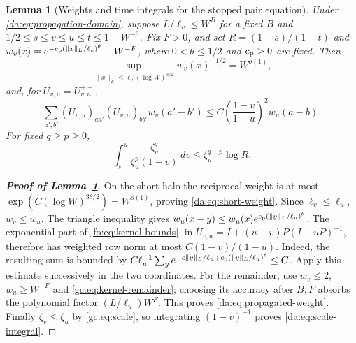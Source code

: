 \documentclass[11pt]{article}
\numberwithin{equation}{section}
\newtheorem{lemma}[theorem]{Lemma}
\theoremstyle{remark}
\begin{document}
\begin{lemma}[Weights and time integrals for the stopped pair equation]
\label{da:lem:stopped-pair-weights}
Under \eqref{da:eq:propagation-domain}, suppose
$L/\ell_v\le W^{B}$ for a fixed $B$ and $1/2\le s\le v\le u\le t\le1-W^{-3}$.
Fix $F>0$, and set $R=(1-s)/(1-t)$ and
$w_v(x)=e^{-c_{\rm p}(\|x\|_L/\ell_v)^\theta}+W^{-F}$,
where $0<\theta\le1/2$ and $c_{\rm p}>0$ are fixed.
Then
\begin{equation}\label{da:eq:short-weight}
 \sup_{\|x\|_L\le\ell_v(\log W)^{3/2}}w_v(x)^{-1/2}=W^{o(1)},
\end{equation}
and, for $U_{v,u}=U_{v,u}^{+-}$,
\begin{equation}\label{da:eq:propagated-weight}
 \sum_{a',b'}(U_{v,u})_{aa'}(U_{v,u})_{bb'}w_v(a'-b')
 \le C\left(\frac{1-v}{1-u}\right)^2 w_u(a-b).
\end{equation}
For fixed $q\ge p\ge0$,
\begin{equation}\label{da:eq:scale-integral}
 \int_s^u\frac{\zeta_v^q}{\zeta_u^p(1-v)}\,dv
 \le\zeta_u^{q-p}\log R.
\end{equation}
\end{lemma}
\begin{proof}[\textbf{Proof of Lemma~\ref{da:lem:stopped-pair-weights}}]
On the short halo the reciprocal weight is at most
$\exp(C(\log W)^{3\theta/2})=W^{o(1)}$, proving
\eqref{da:eq:short-weight}. Since $\ell_v\le\ell_u$, $w_v\le w_u$.
The triangle inequality gives
$w_u(x-y)\le w_u(x)e^{c_{\rm p}(\|y\|_L/\ell_u)^\theta}$.
The exponential part of \eqref{fo:eq:kernel-bounds}, in
$U_{v,u}=I+(u-v)P(I-uP)^{-1}$, therefore has weighted row norm
at most $C(1-v)/(1-u)$. Indeed, the resulting sum is bounded by
$C\ell_u^{-1}\sum_y e^{-c\|y\|_L/\ell_u+
 c_{\rm p}(\|y\|_L/\ell_u)^\theta}\le C$.
Apply this estimate successively in the two coordinates.
For the remainder, use $w_v\le2$, $w_u\ge W^{-F}$ and
\eqref{gc:eq:kernel-remainder}; choosing its accuracy after $B,F$
absorbs the polynomial factor $(L/\ell_u)W^F$.
This proves \eqref{da:eq:propagated-weight}.
Finally $\zeta_v\le\zeta_u$ by \eqref{gc:eq:scale}, so integrating
$(1-v)^{-1}$ proves \eqref{da:eq:scale-integral}.
\end{proof}
\end{document}
